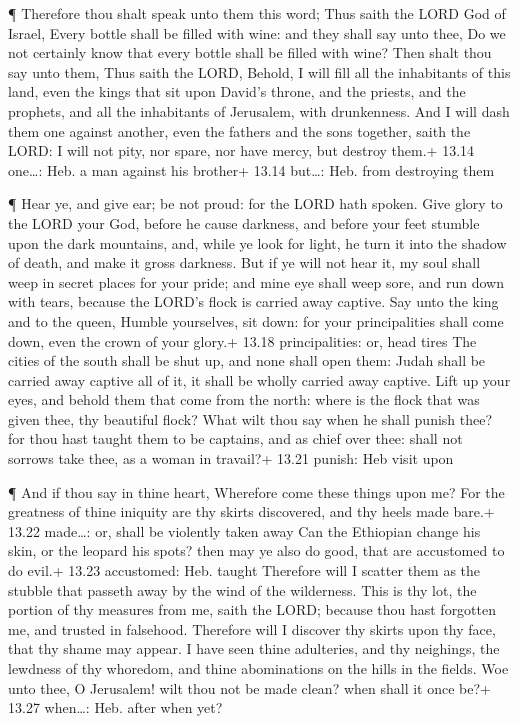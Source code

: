  ¶ Therefore thou shalt speak unto them this word; Thus
saith the LORD God of Israel, Every bottle shall be filled with wine:
and they shall say unto thee, Do we not certainly know that every bottle
shall be filled with wine?  Then shalt thou say unto them,
Thus saith the LORD, Behold, I will fill all the inhabitants of this
land, even the kings that sit upon David's throne, and the priests, and
the prophets, and all the inhabitants of Jerusalem, with drunkenness.
 And I will dash them one against another, even the fathers
and the sons together, saith the LORD: I will not pity, nor spare, nor
have mercy, but destroy them.+ 13.14 one\ldots: Heb. a man against his
brother+ 13.14 but\ldots: Heb. from destroying them

 ¶ Hear ye, and give ear; be not proud: for the LORD hath
spoken.  Give glory to the LORD your God, before he cause
darkness, and before your feet stumble upon the dark mountains, and,
while ye look for light, he turn it into the shadow of death, and make
it gross darkness.  But if ye will not hear it, my soul
shall weep in secret places for your pride; and mine eye shall weep
sore, and run down with tears, because the LORD's flock is carried away
captive.  Say unto the king and to the queen, Humble
yourselves, sit down: for your principalities shall come down, even the
crown of your glory.+ 13.18 principalities: or, head tires 
The cities of the south shall be shut up, and none shall open them:
Judah shall be carried away captive all of it, it shall be wholly
carried away captive.  Lift up your eyes, and behold them
that come from the north: where is the flock that was given thee, thy
beautiful flock?  What wilt thou say when he shall punish
thee? for thou hast taught them to be captains, and as chief over thee:
shall not sorrows take thee, as a woman in travail?+ 13.21 punish: Heb
visit upon

 ¶ And if thou say in thine heart, Wherefore come these
things upon me? For the greatness of thine iniquity are thy skirts
discovered, and thy heels made bare.+ 13.22 made\ldots: or, shall be
violently taken away  Can the Ethiopian change his skin, or
the leopard his spots? then may ye also do good, that are accustomed to
do evil.+ 13.23 accustomed: Heb. taught  Therefore will I
scatter them as the stubble that passeth away by the wind of the
wilderness.  This is thy lot, the portion of thy measures
from me, saith the LORD; because thou hast forgotten me, and trusted in
falsehood.  Therefore will I discover thy skirts upon thy
face, that thy shame may appear.  I have seen thine
adulteries, and thy neighings, the lewdness of thy whoredom, and thine
abominations on the hills in the fields. Woe unto thee, O Jerusalem!
wilt thou not be made clean? when shall it once be?+ 13.27 when\ldots:
Heb. after when yet?

